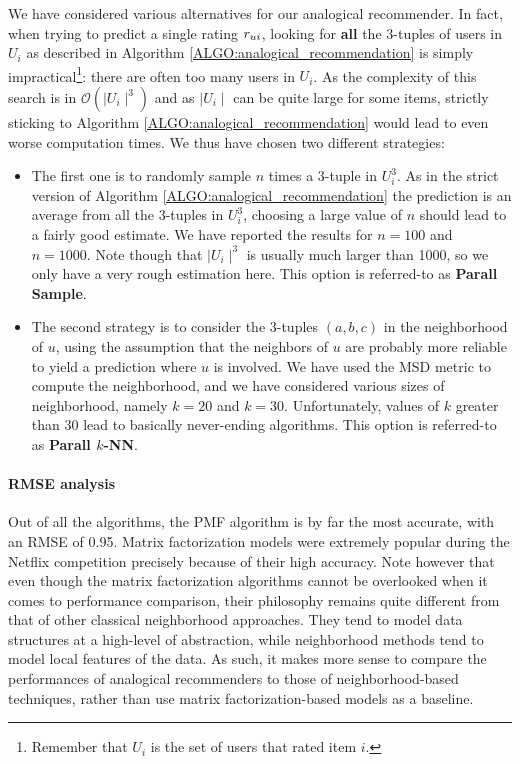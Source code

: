 We have considered various alternatives for our analogical
recommender. In fact, when trying to predict a single rating $r_{ui}$, looking
for \textbf{all} the $3$-tuples of users in $U_i$ as described in Algorithm
\ref{ALGO:analogical_recommendation} is simply impractical\footnote{Remember
that $U_i$ is the set of users that rated item $i$.}: there are often too
many users in $U_i$. As the complexity of this search is in $\mathcal{O}(\mid
U_i\mid^3)$ and as $\mid U_i\mid$ can be quite large for some items, strictly
sticking to Algorithm \ref{ALGO:analogical_recommendation} would lead to
even worse computation times. We thus have chosen two different strategies:
\begin{itemize}
  \item The first one is to randomly sample $n$ times a $3$-tuple in $U_i^3$.
    As in the strict version of Algorithm \ref{ALGO:analogical_recommendation}
    the prediction is an average from all the $3$-tuples in $U_i^3$, choosing a
    large value of $n$ should lead to a fairly good estimate. We have reported
    the results for $n = 100$ and $n = 1000$. Note though that $\mid U_i
    \mid^3$ is usually much larger than 1000, so we only have a very rough
    estimation here. This option is referred-to as \textbf{Parall Sample}.
  \item The second strategy is to consider the $3$-tuples $(a, b, c)$ in the
    neighborhood of $u$, using the assumption that the neighbors of $u$ are
    probably more reliable to yield a prediction where $u$ is involved. We have
    used the MSD metric to compute the neighborhood, and we have considered various
    sizes of neighborhood, namely $k = 20$  and $k = 30$. Unfortunately, values
    of $k$ greater than $30$ lead to basically never-ending algorithms. This
    option is referred-to as \textbf{Parall $k$-NN}.
\end{itemize}


\paragraph{RMSE analysis\\}

Out of all the algorithms, the PMF algorithm is by far the most
accurate, with an RMSE of 0.95. Matrix factorization  models were extremely popular during the
Netflix competition precisely because of their high accuracy. Note however that
even though the matrix factorization algorithms cannot be overlooked when it comes
to performance comparison, their philosophy remains quite different from that
of other classical neighborhood approaches. They tend to model data structures
at a high-level of abstraction, while neighborhood methods tend to model local
features of the data. As such, it makes more sense to compare the performances
of analogical recommenders to those of neighborhood-based techniques, rather
than use matrix factorization-based models as a baseline.


